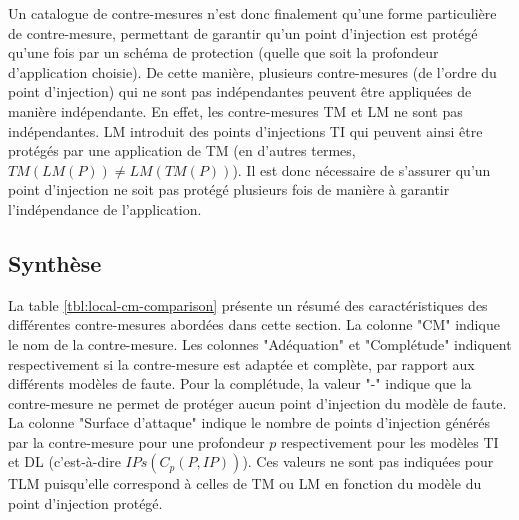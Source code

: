             Un catalogue de contre-mesures n'est donc finalement qu'une forme particulière de contre-mesure, permettant de garantir qu'un point d'injection est protégé qu'une fois par un schéma de protection (quelle que soit la profondeur d'application choisie).
            De cette manière, plusieurs contre-mesures (de l'ordre du point d'injection) qui ne sont pas indépendantes peuvent être appliquées de manière indépendante.
            En effet, les contre-mesures \gls{TM} et \gls{LM} ne sont pas indépendantes. \gls{LM} introduit des points d'injections \gls{TI} qui peuvent ainsi être protégés par une application de \gls{TM} (en d'autres termes, $TM(LM(P)) \neq LM(TM(P))$).
            Il est donc nécessaire de s'assurer qu'un point d'injection ne soit pas protégé plusieurs fois de manière à garantir l'indépendance de l'application.
                    
        \subsection{Synthèse}
        \label{sec:cm-synthesis}
        
            La table \ref{tbl:local-cm-comparison} présente un résumé des caractéristiques des différentes contre-mesures abordées dans cette section. La colonne "CM" indique le nom de la contre-mesure.
            Les colonnes "Adéquation" et "Complétude" indiquent respectivement si la contre-mesure est adaptée et complète, par rapport aux différents modèles de faute. Pour la complétude, la valeur "-" indique que la contre-mesure ne permet de protéger aucun point d'injection du modèle de faute.
            La colonne "Surface d'attaque" indique le nombre de points d'injection générés par la contre-mesure pour une profondeur $p$ respectivement pour les modèles \gls{TI} et \gls{DL} (c'est-à-dire $IPs(C_p(P, IP))$).
            Ces valeurs ne sont pas indiquées pour \gls{TLM} puisqu'elle correspond à celles de \gls{TM} ou \gls{LM} en fonction du modèle du point d'injection protégé.
            
